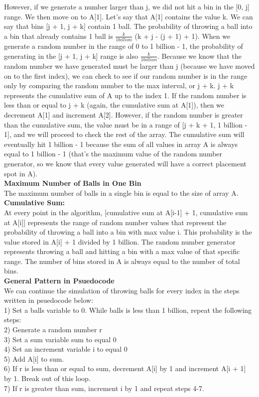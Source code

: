 \documentclass[11pt, solution, letterpaper]{format}
\begin{document}
However, if we generate a number larger than j, we did not hit a bin in the [0, j] range. We then move on to A[1]. Let's say that A[1] contains the value k. We can say that bins [j + 1, j + k] contain 1 ball.  The probability of throwing a ball into a bin that already contains 1 ball is $\frac{k}{1 billion}$ (k + j - (j + 1) + 1). When we generate a random number in the range of 0 to 1 billion - 1, the probability of generating in the [j + 1, j + k] range is also $\frac{k}{1 billion}$. Because we know that the random number we have generated must be larger than j (because we have moved on to the first index), we can check to see if our random number is in the range only by comparing the random number to the max interval, or j + k. j + k represents the cumulative sum of A up to the index 1.  If the random number is less than or equal to j + k (again, the cumulative sum at A[1]), then we decrement A[1] and increment A[2]. However, if the random number is greater than the cumulative sum, the value must be in a range of [j + k + 1, 1 billion - 1], and we will proceed to check the rest of the array. The cumulative sum will eventually hit 1 billion - 1 because the sum of all values in array A is always equal to 1 billion - 1 (that's the maximum value of the random number generator, so we know that every value generated will have a correct placement spot in A).\\

\textbf{Maximum Number of Balls in One Bin}\\
The maximum number of balls in a single bin is equal to the size of array A.\\

\textbf{Cumulative Sum:}\\
At every point in the algorithm, [cumulative sum at A[i-1] + 1, cumulative sum at A[i]] represents the range of random number values that represent the probability of throwing a ball into a bin with max value i. This probability is the value stored in A[i] + 1 divided by 1 billion. The random number generator represents throwing a ball and hitting a bin with a max value of that specific range. The number of bins stored in A is always equal to the number of total bins.\\

\textbf{General Pattern in Psuedocode}\\
We can continue the simulation of throwing balls for every index in the steps written in psuedocode below:\\
1) Set a balls variable to 0. While balls is less than 1 billion, repeat the following steps:\\
2) Generate a random number r\\
3) Set a sum variable sum to equal 0\\
4) Set an increment variable i to equal 0\\
5) Add A[i] to sum.\\
6) If r is less than or equal to sum, decrement A[i] by 1 and increment A[i + 1] by 1. Break out of this loop.\\
7) If r is greater than sum, increment i by 1 and repeat steps  4-7.\\
\end{document}
